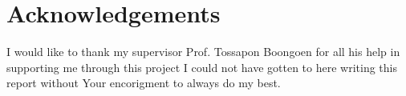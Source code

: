 \thispagestyle{empty}


\section*{\centering Acknowledgements}

I would like to thank my supervisor Prof. Tossapon Boongoen for all his help in supporting me through this project I could
not have gotten to here writing this report without Your encorigment to always do my best.
